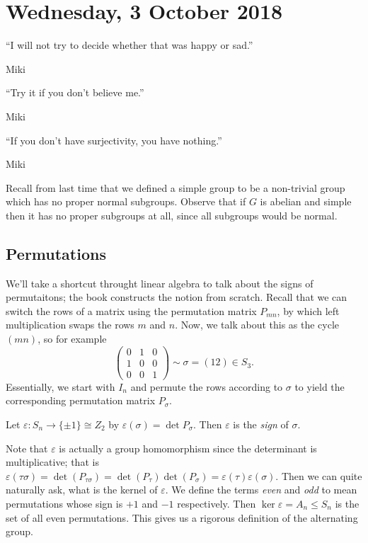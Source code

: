 \section{Wednesday, 3 October 2018}

\epigraph{``I will not try to decide whether that was happy or sad.''}{Miki}

\epigraph{``Try it if you don't believe me.''}{Miki}

\epigraph{``If you don't have surjectivity, you have nothing.''}{Miki}

Recall from last time that we defined a simple group to be a non-trivial group which has no proper normal subgroups. Observe that if $G$ is abelian and simple then it has no proper subgroups at all, since all subgroups would be normal.

\subsection{Permutations}

We'll take a shortcut throught linear algebra to talk about the signs of permutaitons; the book constructs the notion from scratch. Recall that we can switch the rows of a matrix using the permutation matrix $P_{mn}$, by which left multiplication swaps the rows $m$ and $n$. Now, we talk about this as the cycle $(mn)$, so for example
\[ \begin{pmatrix}
0 & 1 & 0 \\
1 & 0 & 0 \\
0 & 0 & 1
\end{pmatrix} \sim \sigma = (12) \in S_3. \]
Essentially, we start with $I_n$ and permute the rows according to $\sigma$ to yield the corresponding permutation matrix $P_\sigma$.

\begin{definition}
Let $\varepsilon : S_n \to \{\pm 1\} \cong Z_2$ by $\varepsilon(\sigma) = \det P_\sigma$. Then $\varepsilon$ is the \emph{sign} of $\sigma$.
\end{definition}

Note that $\varepsilon$ is actually a group homomorphism since the determinant is multiplicative; that is $\varepsilon(\tau\sigma) = \det(P_{\tau\sigma}) = \det(P_\tau)\det(P_\sigma) = \varepsilon(\tau)\varepsilon(\sigma)$. Then we can quite naturally ask, what is the kernel of $\varepsilon$. We define the terms \emph{even} and \emph{odd} to mean permutations whose sign is $+1$ and $-1$ respectively. Then $\ker\varepsilon = A_n \leq S_n$ is the set of all even permutations. This gives us a rigorous definition of the alternating group.

